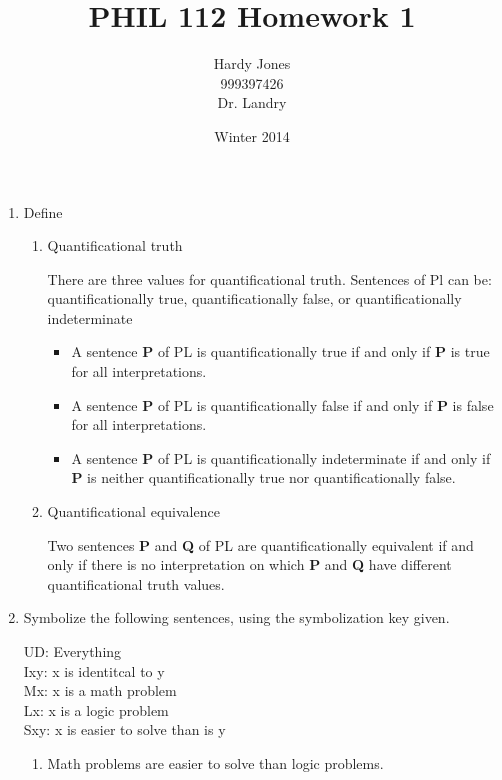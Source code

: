 \documentclass[12pt,letterpaper]{article}
\title{PHIL 112 Homework 1\vspace{-2ex}}
\author{Hardy Jones\\
        999397426\\
        Dr. Landry\vspace{-2ex}}
\date{Winter 2014}
\begin{document}
  \maketitle

  \begin{enumerate}
    \item Define
      \begin{enumerate}
        \item Quantificational truth

          There are three values for quantificational truth.
          Sentences of Pl can be:
          quantificationally true, quantificationally false, or quantificationally indeterminate
          \begin{itemize}
            \item
              A sentence \textbf{P} of PL is quantificationally true if and only if
              \textbf{P} is true for all interpretations.
            \item
              A sentence \textbf{P} of PL is quantificationally false if and only if
              \textbf{P} is false for all interpretations.
            \item
              A sentence \textbf{P} of PL is quantificationally indeterminate if and only if
              \textbf{P} is neither quantificationally true nor quantificationally false.
          \end{itemize}
        \item Quantificational equivalence

          Two sentences \textbf{P} and \textbf{Q} of PL are quantificationally equivalent if and only if
          there is no interpretation on which \textbf{P} and \textbf{Q} have different quantificational truth values.
      \end{enumerate}

    \item Symbolize the following sentences, using the symbolization key given.

      UD: Everything \\
      Ixy: x is identitcal to y \\
      Mx: x is a math problem \\
      Lx: x is a logic problem \\
      Sxy: x is easier to solve than is y
      \begin{enumerate}
        \item Math problems are easier to solve than logic problems.


\end{enumerate}
\end{enumerate}
\end{document}
